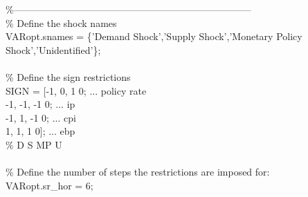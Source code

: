 \hspace{1mm}\hspace{5mm} \textcolor{matlabgreen}{\%--------------------------------------------------------------------------  }\\ 
\hspace{1mm}\hspace{5mm} \textcolor{matlabgreen}{\% Define the shock names }\\ 
\hspace{1mm}\hspace{5mm} VARopt.snames = \{\textcolor{matlabpurple}{'Demand Shock'},\textcolor{matlabpurple}{'Supply Shock'},\textcolor{matlabpurple}{'Monetary Policy Shock'},\textcolor{matlabpurple}{'Unidentified'}\}; \\ 
\hspace{1mm}\hspace{5mm}  \\ 
\hspace{1mm}\hspace{5mm} \textcolor{matlabgreen}{\% Define the sign restrictions }\\ 
\hspace{1mm}\hspace{5mm} SIGN = [-1,       0,       1      0;        ... policy rate \\ 
\hspace{1mm}\hspace{5mm} -1,      -1,      -1      0;        ... ip         \\ 
\hspace{1mm}\hspace{5mm} -1,       1,      -1      0;        ... cpi \\ 
\hspace{1mm}\hspace{5mm} 1,       1,       1      0];       ... ebp \\ 
\hspace{1mm}\hspace{5mm} \textcolor{matlabgreen}{\% D        S        MP     U    }\\ 
\hspace{1mm}\hspace{5mm}  \\ 
\hspace{1mm}\hspace{5mm} \textcolor{matlabgreen}{\% Define the number of steps the restrictions are imposed for: }\\ 
\hspace{1mm}\hspace{5mm} VARopt.sr\_hor = 6; \\ 
